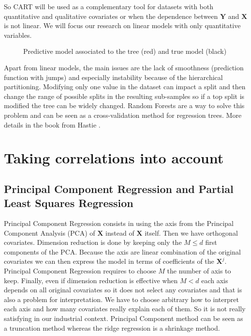 \documentclass[12pt,a4paper]{report}
\begin{document}
		So CART will be used as a complementary tool for datasets with both quantitative and qualitative covariates or when the dependence between $\boldsymbol{Y}$ and $\boldsymbol{X}$ is not linear. We will focus our research on linear models with only quantitative variables.
	\\
	
\begin{figure}[h!]
	 \quad
	\caption{Predictive model associated to the tree (red) and true model (black)}\label{arbretrivial}
\end{figure}

 Apart from linear models, the main issues are the lack of smoothness (prediction function with jumps) and especially instability because of the hierarchical partitioning. Modifying only one value in the dataset can impact a split and then change the range of possible splits in the resulting sub-samples so if a top split is modified the tree can be widely changed. Random Forests are a way to solve this problem and can be seen as a cross-validation method for regression trees. More details in the book from Hastie \cite{hastie2009elements}.	
	
	
		
			
	\section{Taking correlations into account}		%
		\subsection{Principal Component Regression and Partial Least Squares Regression}
	Principal Component Regression \cite{jackson2005user} consists in using the axis from the Principal Component Analysis (PCA) of $\boldsymbol{X}$ instead of $\boldsymbol{X}$ itself. Then we have orthogonal covariates. Dimension reduction is done by keeping only the $M \leq d$ first components of the PCA. Because the axis are linear combination of the original covariates we can then express the model in terms of coefficients of the $\boldsymbol{X}^j$.\\
	
	Principal Component Regression requires to choose $M$ the number of axis to keep. Finally, even if dimension reduction is effective when $M<d$ each axis depends on all original covariates so it does not select any covariates and that is also a problem for interpretation. We have to choose arbitrary how to interpret each axis and how many covariates really explain each of them. So it is not really satisfying in our industrial context. Principal Component method can be seen as a truncation method whereas the ridge regression is a shrinkage method. \\
	
\end{document}
